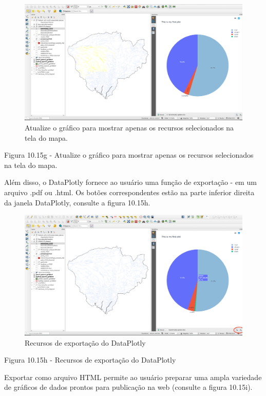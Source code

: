 \documentclass[
]{krantz}
\begin{document}
\begin{figure}
\centering
\includegraphics{media/modulo10/fig1015_g.png}
\caption{Atualize o gráfico para mostrar apenas os recursos selecionados na tela do mapa.}
\end{figure}

Figura 10.15g - Atualize o gráfico para mostrar apenas os recursos selecionados na tela do mapa.

Além disso, o DataPlotly fornece ao usuário uma função de exportação - em um arquivo .pdf ou .html. Os botões correspondentes estão na parte inferior direita da janela DataPlotly, consulte a figura 10.15h.

\begin{figure}
\centering
\includegraphics{media/modulo10/fig1015_h.png}
\caption{Recursos de exportação do DataPlotly}
\end{figure}

Figura 10.15h - Recursos de exportação do DataPlotly

Exportar como arquivo HTML permite ao usuário preparar uma ampla variedade de gráficos de dados prontos para publicação na web (consulte a figura 10.15i).
\end{document}

